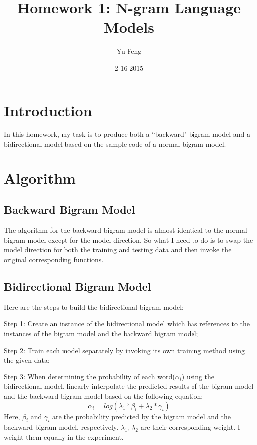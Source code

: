 \documentclass[10pt]{article}
\title{Homework 1: N-gram Language Models}
\author{Yu Feng}
\date{2-16-2015}
\begin{document}
\maketitle

\section{Introduction}
In this homework, my task is to produce both a ``backward" bigram model and a bidirectional model based on the sample code of a normal bigram model. 
 
\section{Algorithm}\label{sec:alg}

\subsection{Backward Bigram Model}

The algorithm for the backward bigram model is almost identical to the normal bigram model except for the model direction. So what I need to do is to swap the model direction for both the training and testing data and then invoke the original corresponding functions. 


\subsection{Bidirectional Bigram Model}

Here are the steps to build the bidirectional bigram model:

Step 1: Create an instance of the bidirectional model which has references to the instances of the bigram model and the backward bigram model;

Step 2: Train each model separately by invoking its own training method using the given data;

Step 3: When determining the probability of each word($\alpha_i$) using the bidirectional model, linearly interpolate the predicted results of the bigram model and the backward bigram model based on the following equation:
\[
  \alpha_{i} = log(\lambda_{1} * \beta_{i} + \lambda_{2} * \gamma_{i})
\] 
Here, $\beta_{i}$ and $\gamma_{i}$ are the probability predicted by the bigram model and the backward bigram model, respectively. $\lambda_{1}$, $\lambda_{2}$ are their corresponding weight. I weight them equally in the experiment. 
\end{document}
